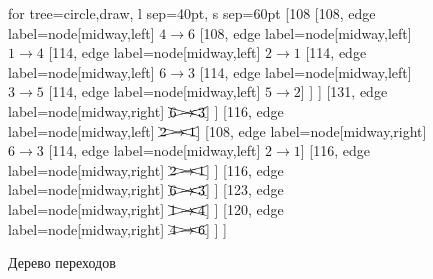 \begin{figure}[H]
\begin{center}
	\begin{forest}
	for tree={circle,draw, l sep=40pt, s sep=60pt}
	[108 
	    [108, edge label={node[midway,left] {$4 \rightarrow 6$}}  
	      [108, edge label={node[midway,left] {$1 \rightarrow 4$}} 
	      	[114, edge label={node[midway,left] {$2 \rightarrow 1$}}
	      		[114, edge label={node[midway,left] {$6 \rightarrow 3$}}
	      			[114, edge label={node[midway,left] {$3 \rightarrow 5$}}
	      				[114, edge label={node[midway,left] {$5 \rightarrow 2$}}]
	      			]
	      		]
	      		[131, edge label={node[midway,right] {$\xcancel{6 \rightarrow 3}$}}]
	      	]
	      	[116, edge label={node[midway,left] {$\xcancel{2 \rightarrow 1}$}}]
	      	[108, edge label={node[midway,right] {$6 \rightarrow 3$}}
	      		[114, edge label={node[midway,left] {$2 \rightarrow 1$}}]
	      		[116, edge label={node[midway,right] {$\xcancel{2 \rightarrow 1}$}}]
	      	]
	      	[116, edge label={node[midway,right] {$\xcancel{6 \rightarrow 3}$}}]
	      ] 
	      [123, edge label={node[midway,right] {$\xcancel{1 \rightarrow 4}$}}] 
	    ]
	    [120, edge label={node[midway,right] {$\xcancel{4 \rightarrow 6}$}}]
	   ]
	]
	\end{forest}
	\caption{Дерево переходов}
	\label{pic:graph}
\end{center}
\end{figure}
